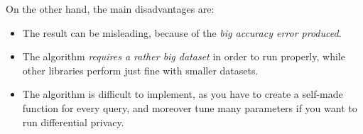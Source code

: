 On the other hand, the main disadvantages are:
\begin{itemize}
    \item The result can be misleading, because of the \emph{big accuracy error produced}.
    \item The algorithm \emph{requires a rather big dataset} in order to run properly, while other libraries perform just fine with smaller datasets.
    \item The algorithm is difficult to implement, as you have to create a self-made function for every query, and moreover tune many parameters if you want to run differential privacy.

\end{itemize}
